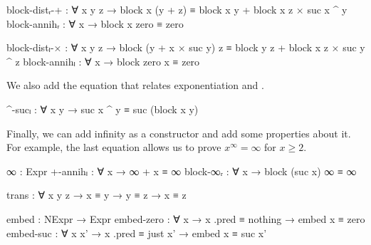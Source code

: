 \begin{AgdaAlign}
\begin{code}
    block-distᵣ-+ :
      ∀ x y z →
      block x (y + z) ≡ block x y + block x z × suc x ^ y
    block-annihᵣ : ∀ x → block x zero ≡ zero

    block-distₗ-× :
      ∀ x y z →
      block (y + x × suc y) z ≡
      block y z + block x z × suc y ^ z
    block-annihₗ : ∀ x → block zero x ≡ zero
\end{code}
We also add the equation that relates exponentiation and
.
\begin{code}
    ^-sucₗ : ∀ x y → suc x ^ y ≡ suc (block x y)
\end{code}
Finally, we can add infinity as a constructor and add some properties about it.
For example, the last equation allows us to prove $x^\infty = \infty$ for $x \ge
2$.
\begin{code}
    ∞ : Expr
    +-annihₗ : ∀ x → ∞ + x ≡ ∞
    block-∞ᵣ : ∀ x → block (suc x) ∞ ≡ ∞
\end{code}
\begin{code}[hide]
    trans : ∀ {x y z} → x ≡ y → y ≡ z → x ≡ z

    embed : NExpr → Expr
    embed-zero : ∀ x → x .pred ≡ nothing → embed x ≡ zero
    embed-suc : ∀ x x' → x .pred ≡ just x' → embed x ≡ suc x'
\end{code}
\end{AgdaAlign}
